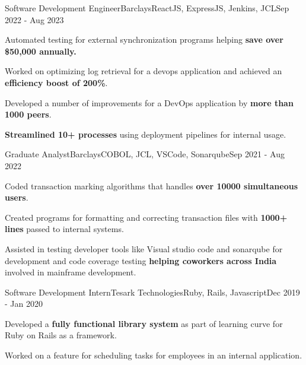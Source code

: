 \documentclass[letterpaper]{resume_config}
\begin{document}
\WorkExperience
    {Software Development Engineer}{Barclays}{ReactJS, ExpressJS, Jenkins, JCL}{Sep 2022 - Aug 2023}
    {
        \item{Automated testing for external synchronization programs helping \textbf{save over \$50,000 annually.}}
        \item {Worked on optimizing log retrieval for a devops application and achieved an \textbf{efficiency boost of 200\%}.}
        \item {Developed a number of improvements for a DevOps application by \textbf{more than 1000 peers}.} 
        \item {\textbf{Streamlined 10+ processes} using deployment pipelines for internal usage.}
    }
\WorkExperience
    {Graduate Analyst}{Barclays}{COBOL, JCL, VSCode, Sonarqube}{Sep 2021 - Aug 2022}
    {
        \item {Coded transaction marking algorithms that handles \textbf{over 10000 simultaneous users}.}
        \item {Created programs for formatting and correcting transaction files with \textbf{1000+ lines} passed to internal systems.}
        \item {Assisted in testing developer tools like Visual studio code and sonarqube for development and code coverage testing \textbf{helping coworkers across India} involved in mainframe development.}
    }
\WorkExperience
    {Software Development Intern}{Tesark Technologies}{Ruby, Rails, Javascript}{Dec 2019 - Jan 2020}
    {
        \item {Developed a \textbf{fully functional library system} as part of learning curve for Ruby on Rails as a framework.}
        \item {Worked on a feature for scheduling tasks for employees in an internal application.}
    }
\vspace{-10pt}
\end{document}
